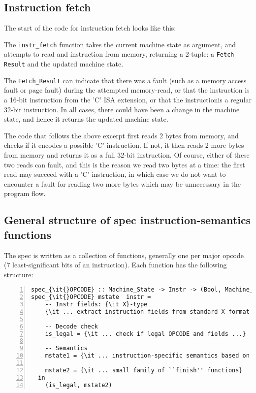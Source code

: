 \documentclass[11pt]{article}
\begin{document}
\subsection{Instruction fetch}

The start of the code for instruction fetch looks like this:



The \verb|instr_fetch| function takes the current machine state as
argument, and attempts to read and instruction from memory, returning
a 2-tuple: a \verb|Fetch Result| and the updated machine state.

The \verb|Fetch_Result| can indicate that there was a fault (such as a
memory access fault or page fault) during the attempted memory-read,
or that the instruction is a 16-bit instruction from the 'C' ISA
extension, or that the instructionis a regular 32-bit instruction.  In
all cases, there could have been a change in the machine state, and
hence it returns the updated machine state.

The code that follows the above excerpt first reads 2 bytes from
memory, and checks if it encodes a possible 'C' instruction. If not,
it then reads 2 more bytes from memory and returns it as a full 32-bit
instruction.  Of course, either of these two reads can fault, and this
is the reason we read two bytes at a time: the first read may succeed
with a 'C' instruction, in which case we do not want to encounter a
fault for reading two more bytes which may be unnecessary in the
program flow.


\subsection{General structure of spec instruction-semantics functions}

The spec is written as a collection of functions, generally one per
major opcode (7 least-significant bits of an instruction).  Each
function has the following structure:

{\small
\begin{Verbatim}[frame=single, numbers=left, commandchars=\\\{\}]
spec_{\it{}OPCODE} :: Machine_State -> Instr -> (Bool, Machine_State) \\
spec_{\it{}OPCODE} mstate  instr =
    -- Instr fields: {\it X}-type
    {\it ... extract instruction fields from standard X format ...}

    -- Decode check
    is_legal = {\it ... check if legal OPCODE and fields ...}

    -- Semantics
    mstate1 = {\it ... instruction-specific semantics based on {\tt mstate} ...}

    mstate2 = {\it ... small family of ``finish'' functions}
  in
    (is_legal, mstate2)
\end{Verbatim}
}
\end{document}
